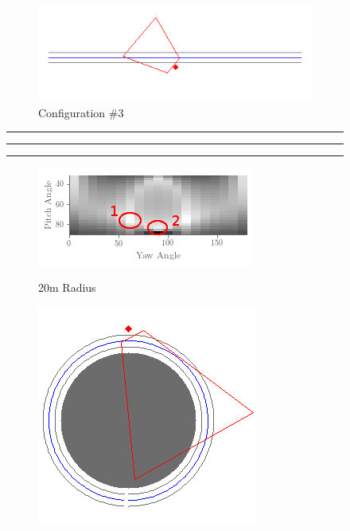 \documentclass[a4paper,12pt,twoside,openright]{report}
\begin{document}
\begin{figure}[h!]
\begin{subfigure}[b]{0.49\textwidth}
    \centering
    \includegraphics[width=\textwidth]{figures/simple_objective/0_curvature_pos3_small.png}
    \caption{Configuration \#3}
\end{subfigure}
\hrule
\hrule
\hrule

\begin{subfigure}[b]{0.42\textwidth}
    \centering
    \includegraphics[width=\textwidth]{figures/simple_objective/pitch_yaw_at_radius_20_annotated.png}
    \label{fig:simpleobjective:0curvature}
    \caption{20m Radius}
\end{subfigure}
\begin{subfigure}[b]{0.28\textwidth}
    \centering
    \includegraphics[width=\textwidth]{figures/simple_objective/radius_20m_pos1_small.png}

\end{subfigure}
\end{figure}
\end{document}
